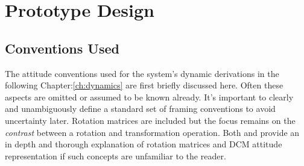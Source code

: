 \chapter{Prototype Design}
\label{ch:proto}
\section{Conventions Used}
\label{sec:proto.conventions}
The attitude conventions used for the system's dynamic derivations in the following Chapter:\ref{ch:dynamics} are first briefly discussed here. Often these aspects are omitted or assumed to be known already. It's important to clearly and unambiguously define a standard set of framing conventions to avoid uncertainty later. Rotation matrices are included but the focus remains on the \emph{contrast} between a rotation and transformation operation. Both \cite{spacecraftattitutdequaternions} and \cite{rigidbodylecture} provide an in depth and thorough explanation of rotation matrices and DCM attitude representation if such concepts are unfamiliar to the reader.
